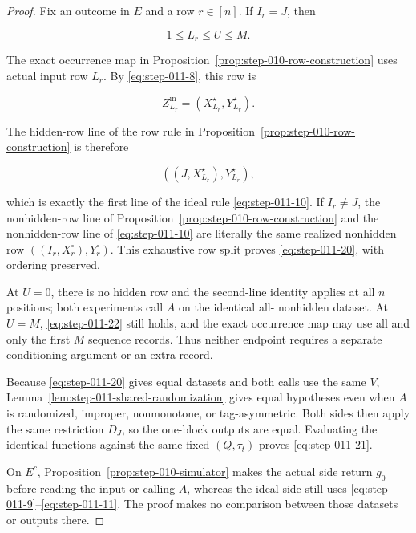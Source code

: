 \begin{proof}
Fix an outcome in \(E\) and a row \(r\in[n]\). If \(I_r=J\), then

\[
  1\le L_r\le U\le M.
\tag{S11.22}\label{eq:step-011-22}
\]

The exact occurrence map in
Proposition~\ref{prop:step-010-row-construction} uses actual input row
\(L_r\).
By \eqref{eq:step-011-8}, this row is

\[
  Z^{\mathrm{in}}_{L_r}
  =(X_{L_r}^\star,Y_{L_r}^\star).
\]

The hidden-row line of the row rule in
Proposition~\ref{prop:step-010-row-construction} is therefore

\[
  ((J,X_{L_r}^\star),Y_{L_r}^\star),
\]

which is exactly the first line of the ideal rule \eqref{eq:step-011-10}. If \(I_r\ne J\),
the nonhidden-row line of
Proposition~\ref{prop:step-010-row-construction} and the nonhidden-row line
of \eqref{eq:step-011-10} are literally the same realized
nonhidden row \(((I_r,X_r^\circ),Y_r^\circ)\). This exhaustive row split
proves \eqref{eq:step-011-20}, with ordering preserved.

At \(U=0\), there is no hidden row and the second-line identity applies at
all \(n\) positions; both experiments call \(A\) on the identical all-
nonhidden dataset. At \(U=M\), \eqref{eq:step-011-22} still holds, and the exact occurrence
map may use all and only the first \(M\) sequence records. Thus neither
endpoint requires a separate conditioning argument or an extra record.

Because \eqref{eq:step-011-20} gives equal datasets and both calls use the same \(V\),
Lemma~\ref{lem:step-011-shared-randomization} gives equal hypotheses even when
\(A\) is randomized, improper, nonmonotone, or tag-asymmetric. Both sides
then apply the same restriction \(D_J\), so the one-block outputs are
equal. Evaluating the identical functions against the same fixed
\((Q,\tau_t)\) proves \eqref{eq:step-011-21}.

On \(E^c\), Proposition~\ref{prop:step-010-simulator} makes the
actual side return \(g_0\) before reading the input or calling \(A\),
whereas the ideal side still uses \eqref{eq:step-011-9}--\eqref{eq:step-011-11}. The proof makes no comparison
between those datasets or outputs there. \end{proof}

